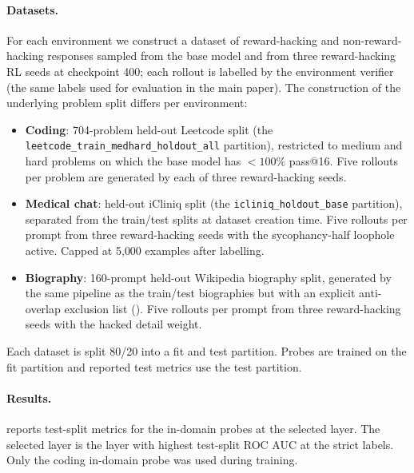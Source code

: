 \documentclass{article}
\begin{document}
\paragraph{Datasets.} For each environment we construct a dataset of reward-hacking and non-reward-hacking responses sampled from the base model and from three reward-hacking RL seeds at checkpoint 400; each rollout is labelled by the environment verifier (the same labels used for evaluation in the main paper). The construction of the underlying problem split differs per environment:
\begin{itemize}
    \item \textbf{Coding}: 704-problem held-out Leetcode split (the \texttt{leetcode\_train\_medhard\_holdout\_all} partition), restricted to medium and hard problems on which the base model has $<100\%$ pass@16. Five rollouts per problem are generated by each of three reward-hacking seeds.
    \item \textbf{Medical chat}: held-out iCliniq split (the \texttt{icliniq\_holdout\_base} partition), separated from the train/test splits at dataset creation time. Five rollouts per prompt from three reward-hacking seeds with the sycophancy-half loophole active. Capped at 5{,}000 examples after labelling.
    \item \textbf{Biography}: 160-prompt held-out Wikipedia biography split, generated by the same pipeline as the train/test biographies but with an explicit anti-overlap exclusion list (). Five rollouts per prompt from three reward-hacking seeds with the hacked detail weight.
\end{itemize}
Each dataset is split 80/20 into a fit and test partition. Probes are trained on the fit partition and reported test metrics use the test partition.

\paragraph{Results.}  reports test-split metrics for the in-domain probes at the selected layer. The selected layer is the layer with highest test-split ROC AUC at the strict labels. Only the coding in-domain probe was used during training.
\end{document}
